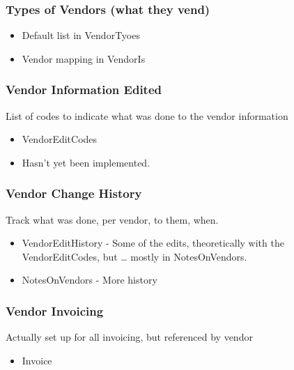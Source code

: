 \documentclass[captions=tablesignature]{scrartcl}
\begin{document}
\subsubsection{Types of Vendors (what they vend)}
\label{sec-2-5-10}
\begin{itemize}
\item Default list in VendorTyoes
\item Vendor mapping in VendorIs
\end{itemize}

\subsubsection{Vendor Information Edited}
\label{sec-2-5-11}
List of codes to indicate what was done to the vendor information
\begin{itemize}
\item VendorEditCodes
\item Hasn't yet been implemented.
\end{itemize}

\subsubsection{Vendor Change History}
\label{sec-2-5-12}
Track what was done, per vendor, to them, when.
\begin{itemize}
\item VendorEditHistory - Some of the edits, theoretically with the
VendorEditCodes, but \ldots{} mostly in NotesOnVendors.
\item NotesOnVendors - More history
\end{itemize}

\subsubsection{Vendor Invoicing}
\label{sec-2-5-13}
Actually set up for all invoicing, but referenced by vendor
\begin{itemize}
\item Invoice
\end{itemize}
\end{document}
